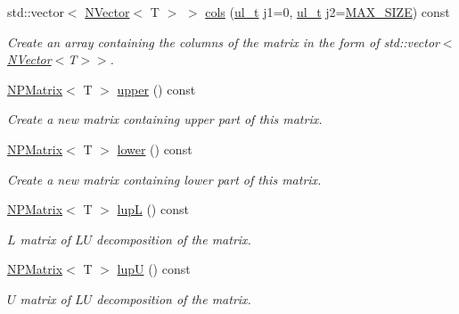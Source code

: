 \begin{Indent}
\begin{DoxyCompactItemize}
std\+::vector$<$ \mbox{\hyperlink{class_n_vector}{N\+Vector}}$<$ T $>$ $>$ \mbox{\hyperlink{class_n_p_matrix_a30c8ad7b415fa92a23375cbad3ee8e37}{cols}} (\mbox{\hyperlink{typedef_8h_a1b140a2034db3f5dfe18a987745df43a}{ul\+\_\+t}} j1=0, \mbox{\hyperlink{typedef_8h_a1b140a2034db3f5dfe18a987745df43a}{ul\+\_\+t}} j2=\mbox{\hyperlink{_n_vector_8h_a0592dba56693fad79136250c11e5a7fe}{M\+A\+X\+\_\+\+S\+I\+ZE}}) const
\begin{DoxyCompactList}\small\item\em Create an array containing the columns of the matrix in the form of {\ttfamily std\+::vector$<$\mbox{\hyperlink{class_n_vector}{N\+Vector}}$<$T$>$$>$}. \end{DoxyCompactList}\item 
\mbox{\hyperlink{class_n_p_matrix}{N\+P\+Matrix}}$<$ T $>$ \mbox{\hyperlink{class_n_p_matrix_a986376cd2765f1864fdac8b264f454ef}{upper}} () const
\begin{DoxyCompactList}\small\item\em Create a new matrix containing upper part of this matrix. \end{DoxyCompactList}\item 
\mbox{\hyperlink{class_n_p_matrix}{N\+P\+Matrix}}$<$ T $>$ \mbox{\hyperlink{class_n_p_matrix_a4618b342917acf71c13a89afc2189eaf}{lower}} () const
\begin{DoxyCompactList}\small\item\em Create a new matrix containing lower part of this matrix. \end{DoxyCompactList}\item 
\mbox{\hyperlink{class_n_p_matrix}{N\+P\+Matrix}}$<$ T $>$ \mbox{\hyperlink{class_n_p_matrix_a21088a7eef02d4d0a0781f616037097a}{lupL}} () const
\begin{DoxyCompactList}\small\item\em $ L $ matrix of $ LU $ decomposition of the matrix. \end{DoxyCompactList}\item 
\mbox{\hyperlink{class_n_p_matrix}{N\+P\+Matrix}}$<$ T $>$ \mbox{\hyperlink{class_n_p_matrix_a8da21c409841e612b72232d1159eec21}{lupU}} () const
\begin{DoxyCompactList}\small\item\em $ U $ matrix of $ LU $ decomposition of the matrix. \end{DoxyCompactList}\end{DoxyCompactItemize}
\end{Indent}
